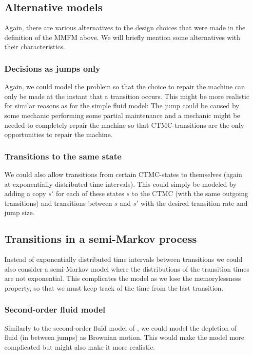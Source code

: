 \subsection{Alternative models}
Again, there are various alternatives to the design choices that were made in the definition of the MMFM above.
We will briefly mention some alternatives with their characteristics.

\subsubsection{Decisions as jumps only}
Again, we could model the problem so that the choice to repair the machine can only be made at the instant that a transition occurs.
This might be more realistic for similar reasons as for the simple fluid model: The jump could be caused by some mechanic performing some partial maintenance and a mechanic might be needed to completely repair the machine so that CTMC-transitions are the only opportunities to repair the machine.

\subsubsection{Transitions to the same state}
We could also allow transitions from certain CTMC-states to themselves (again at exponentially distributed time intervals).
This could simply be modeled by adding a copy $s'$ for each of these states $s$ to the CTMC (with the same outgoing transitions) and transitions between $s$ and $s'$ with the desired transition rate and jump size.

\subsection{Transitions in a semi-Markov process}
Instead of exponentially distributed time intervals between transitions we could also consider a semi-Markov model where the distributions of the transition times are not exponential.
This complicates the model as we lose the memorylessness property, so that we must keep track of the time from the last transition.

\subsubsection{Second-order fluid model}
Similarly to the second-order fluid model of \cite{Gribaudo2007}, we could model the depletion of fluid (in between jumps) as Brownian motion.
This would make the model more complicated but might also make it more realistic.